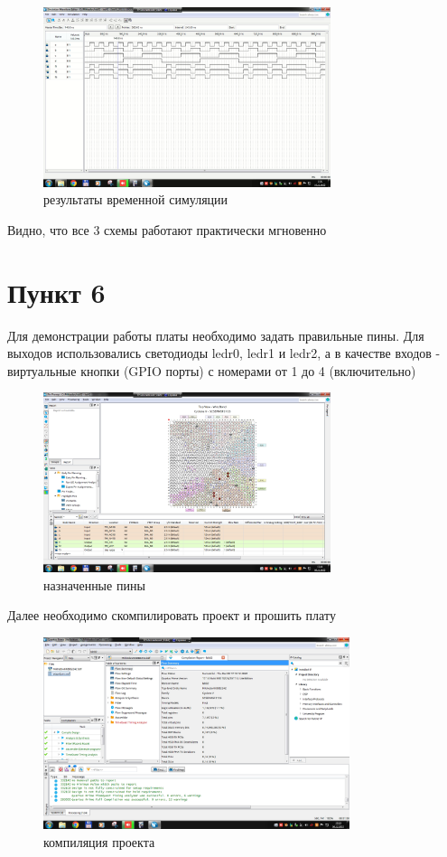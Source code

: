 \documentclass[a4paper]{article}
\begin{document}
  \begin{figure}[H]
    \centering
    \includegraphics[width=0.75\textwidth]{02_50}
    \caption{результаты временной симуляции}
  \end{figure}

  Видно, что все 3 схемы работают практически мгновенно

  \section*{Пункт 6}

  Для демонстрации работы платы необходимо задать правильные пины. Для выходов использовались
  светодиоды ledr0, ledr1 и ledr2, а в качестве входов - виртуальные кнопки (GPIO порты) с
  номерами от 1 до 4 (включительно)

  \begin{figure}[H]
    \centering
    \includegraphics[width=0.75\textwidth]{02_60}
    \caption{назначенные пины}
  \end{figure}

  Далее необходимо скомпилировать проект и прошить плату

  \begin{figure}[H]
    \centering
    \includegraphics[width=0.8\textwidth]{02_61}
    \caption{компиляция проекта}
  \end{figure}
\end{document}
